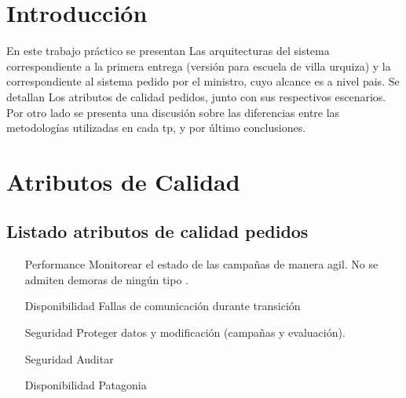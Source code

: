 \documentclass[a4paper, 11pt]{article}
\begin{document}
\pagestyle{myheadings}
\maketitle

\thispagestyle{empty}
\tableofcontents

\newpage

\section{Introducci\'on}

En este trabajo práctico se presentan Las arquitecturas del sistema correspondiente a la primera entrega (versión para escuela de villa urquiza) y la correspondiente al sistema pedido por el ministro, cuyo alcance es a nivel pais.
Se detallan Los atributos de calidad pedidos, junto con sus respectivos escenarios. Por otro lado se presenta una discusión sobre las diferencias entre las metodologías utilizadas en cada tp, y por último conclusiones.
\newpage
\section{Atributos de Calidad}
\subsection{Listado atributos de calidad pedidos}
\begin{itemize}
\item[Performance] Monitorear el estado de las campañas de manera agil. No se admiten demoras de ningún tipo .
\item[Disponibilidad] Fallas de comunicación durante transición %
\item[Seguridad]Proteger datos y modificación (campañas y evaluación).
\item[Seguridad]Auditar
\item[Disponibilidad] Patagonia
\end{itemize}
\end{document}
